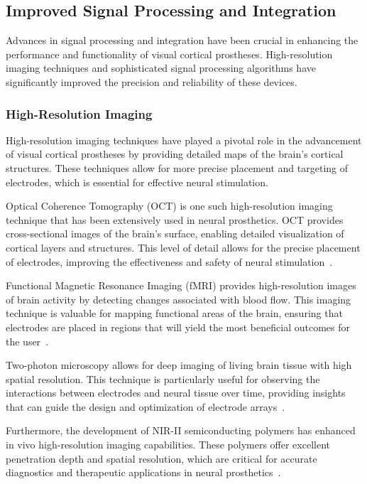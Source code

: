 \documentclass[twocolumn,10pt]{article}
\begin{document}
\subsection{Improved Signal Processing and Integration}
Advances in signal processing and integration have been crucial in enhancing the
performance and functionality of visual cortical prostheses. High-resolution
imaging techniques and sophisticated signal processing algorithms have
significantly improved the precision and reliability of these devices.

\subsubsection*{High-Resolution Imaging}
High-resolution imaging techniques have played a pivotal role in the advancement
of visual cortical prostheses by providing detailed maps of the brain's cortical
structures. These techniques allow for more precise placement and targeting of
electrodes, which is essential for effective neural stimulation.

Optical Coherence Tomography (OCT) is one such high-resolution imaging technique
that has been extensively used in neural prosthetics. OCT provides
cross-sectional images of the brain's surface, enabling detailed visualization
of cortical layers and structures. This level of detail allows for the precise
placement of electrodes, improving the effectiveness and safety of neural
stimulation~\parencite{xieUseOpticalCoherence2022}.

Functional Magnetic Resonance Imaging (fMRI) provides high-resolution images of
brain activity by detecting changes associated with blood flow. This imaging
technique is valuable for mapping functional areas of the brain, ensuring that
electrodes are placed in regions that will yield the most beneficial outcomes
for the user~\parencite{landelleInvestigatingHumanSpinal2021}.

Two-photon microscopy allows for deep imaging of living brain tissue with high
spatial resolution. This technique is particularly useful for observing the
interactions between electrodes and neural tissue over time, providing insights
that can guide the design and optimization of electrode
arrays~\parencite{yangIntegratedMicroprismMicroelectrode2024}.

Furthermore, the development of NIR-II semiconducting polymers has enhanced in
vivo high-resolution imaging capabilities. These polymers offer excellent
penetration depth and spatial resolution, which are critical for accurate
diagnostics and therapeutic applications in neural prosthetics~\parencite{wangRecentProgressSecond2023,kangNIRIISemiconductingPolymers2023}.
\end{document}

